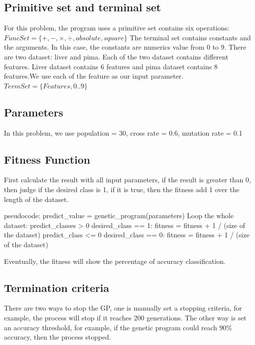 \documentclass[11pt, a4paper, oneside, openright]{article}
\begin{document}
\subsection{Primitive set and terminal set}
For this problem, the program uses a primitive set contains six operations:
\newline \hspace*{5cm} $FuncSet = \{+, -, \times, \div, absolute, square\}$
\newline The terminal set contains constants and the arguments. In this case, the constants are numerics value from 0 to 9. 
There are two dataset: liver and pima. Each of the two dataset contains different features. Liver dataset contains 6 features and pima dataset contains 8 features.We use each of the feature as our input parameter.
\newline \hspace*{5cm} $TermSet = \{Features, 0..9\}$
\subsection{Parameters}
In this problem, we use population = 30, cross rate = 0.6, mutation rate = 0.1
\subsection{Fitness Function}
First calculate the result with all input parameters, if the result is greater than 0, then judge  if the desired class is 1, if it is true, then the fitness add 1 over the length of the dataset.
\begin{program}
\mbox{pseudocode:}
\hspace *{3cm} predict\_value = genetic\_program(parameters)
\hspace *{3cm}		Loop \hspace *{2mm}the \hspace *{2mm}whole \hspace *{2mm}dataset:
\hspace *{3cm}			\IF predict\_classes > 0 \hspace *{2mm} \wedge \hspace *{2mm}desired\_class == 1:
							fitness = fitness + 1 / (size\hspace *{2mm} of \hspace *{2mm}the\hspace *{2mm} dataset)
					\ELSE \IF predict\_class <= 0 \hspace *{2mm}\wedge \hspace *{2mm} desired\_class == 0:
					fitness = fitness + 1 / (size \hspace *{2mm}of \hspace *{2mm}the \hspace *{2mm}dataset)			
 \\%
\end{program}
Eventually, the fitness will show the percentage of accuracy classification.
\subsection{Termination criteria}
There are two ways to stop the GP, one is manually set a stopping criteria, for example, the process will stop if it reaches 200 generations. The other way is set an accuracy threshold, for example, if the genetic program could reach 90\% accuracy, then the process stopped.
\end{document}
